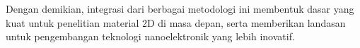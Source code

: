 Dengan demikian, integrasi dari berbagai metodologi ini membentuk dasar yang kuat untuk penelitian material 2D di masa depan, serta memberikan landasan untuk pengembangan teknologi nanoelektronik yang lebih inovatif. %
